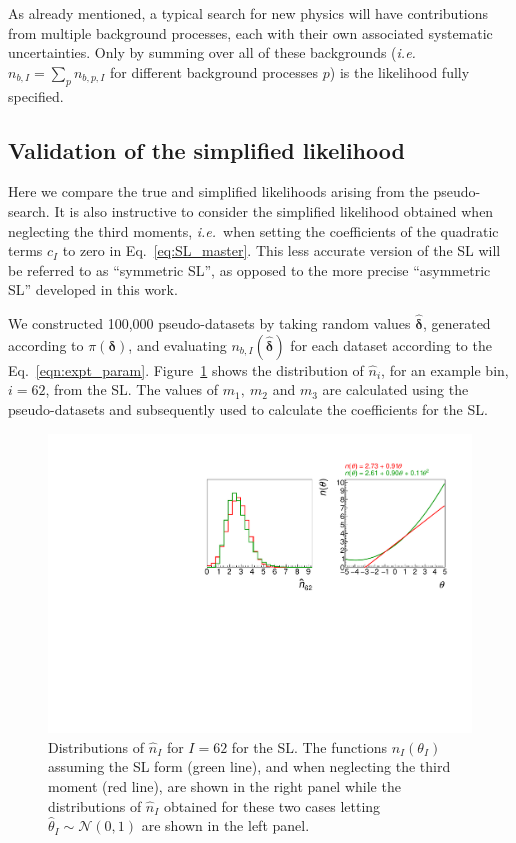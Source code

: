 \documentclass[11pt]{article}
\def\ie{{\it i.e.}}
\begin{document}
As already mentioned, a typical search for new physics will have contributions from multiple background processes, each with their own associated systematic uncertainties.
Only by summing over all of these backgrounds (\ie\ $n_{b,I}=\sum_{p}n_{b,p,I}$ for different background processes $p$) is the likelihood fully specified.









\subsection{Validation of the simplified likelihood}


Here we compare the true and simplified likelihoods arising from the pseudo-search. It is also instructive to consider the simplified likelihood obtained when neglecting the third moments, \ie\ when setting the coefficients of the quadratic terms $c_I$ to zero in Eq.~\eqref{eq:SL_master}. This less accurate version of the SL will be  referred to as ``symmetric SL'', as opposed to the more precise ``asymmetric SL'' developed in this work. 


We constructed 100,000 pseudo-datasets by taking random values ${\hat{\bm{\delta}}}$, generated according to $\pi(\bm{\delta})$, and evaluating
$n_{b,I}(\hat{\bm{\delta}})$ for each dataset according to the Eq.~\eqref{eqn:expt_param}. Figure~\ref{fig:distributions} shows the distribution of $\hat{n}_{i}$, for an example bin, $i=62$,
from the SL. The values of $m_{1},~m_{2}$ and $m_{3}$ are calculated using the pseudo-datasets and subsequently used to calculate the coefficients for the SL.


\begin{figure}[ht]
  \centering
  \includegraphics[width=\textwidth]{figures/compare_62}
  \caption{Distributions of $\hat{n}_{I}$ for $I=62$ for the SL.
    The functions $n_{I}(\theta_{I})$ assuming the SL form (green line),
    and when neglecting the third moment (red line), are shown in the right panel while the distributions
    of $\hat{n}_{I}$ obtained for these two cases letting $\hat{\theta}_{I}\sim\mathcal{N}(0,1)$ are shown in the
    left panel.  }
  \label{fig:distributions}
\end{figure}
\end{document}
